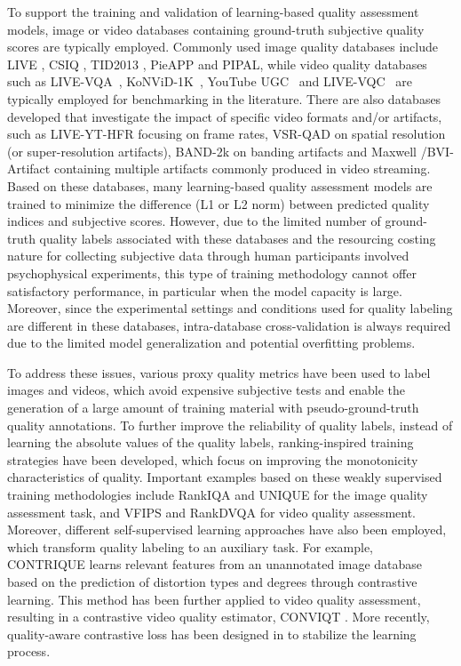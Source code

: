\documentclass[11pt,a4paper]{article}
\begin{document}
To support the training and validation of learning-based quality assessment models, image or video databases containing ground-truth subjective quality scores are typically employed. Commonly used image quality databases include LIVE \cite{sheikh2006astatistical}, CSIQ \cite{larson2010most}, TID2013 \cite{ponomarenko2013color}, PieAPP and PIPAL, while video quality databases such as LIVE-VQA~\cite{seshadrinathan2010study}, KoNViD-1K~\cite{hosu2017konstanz}, YouTube UGC~\cite{wang2019youtube} and LIVE-VQC~\cite{sinno2018large} are typically employed for benchmarking in the literature. There are also databases developed that investigate the impact of specific video formats and/or artifacts, such as LIVE-YT-HFR  \cite{madhusudana2021subjective} focusing on frame rates, VSR-QAD \cite{zhou2024database} on spatial resolution (or super-resolution artifacts), BAND-2k \cite{chen2024band2k} on banding artifacts and Maxwell \cite{wu2023towards}/BVI-Artifact \cite{feng2024bvi} containing multiple artifacts commonly produced in video streaming. Based on these databases, many learning-based quality assessment models are trained to minimize the difference (L1 or L2 norm) between predicted quality indices and subjective scores. However, due to the limited number of ground-truth quality labels associated with these databases and the resourcing costing nature for collecting subjective data through human participants involved psychophysical experiments, this type of training methodology cannot offer satisfactory performance, in particular when the model capacity is large. Moreover, since the experimental settings and conditions used for quality labeling are different in these databases, intra-database cross-validation is always required due to the limited model generalization and potential overfitting problems. 

To address these issues, various proxy quality metrics have been used to label images and videos, which avoid expensive subjective tests and enable the generation of a large amount of training material with pseudo-ground-truth quality annotations. To further improve the reliability of quality labels, instead of learning the absolute values of the quality labels, ranking-inspired training strategies have been developed, which focus on improving the monotonicity characteristics of quality. Important examples based on these weakly supervised training methodologies include RankIQA \cite{liu2017rankiqa} and UNIQUE \cite{zhang2021uncertainty} for the image quality assessment task, and VFIPS \cite{hou2022perceptual} and RankDVQA \cite{feng2024rankdvqa} for video quality assessment. Moreover, different self-supervised learning approaches have also been employed, which transform quality labeling to an auxiliary task. For example, CONTRIQUE \cite{madhusudana2022image} learns relevant features from an unannotated image database based on the prediction of distortion types and degrees through contrastive learning. This method has been further applied to video quality assessment, resulting in a contrastive video quality estimator, CONVIQT \cite{madhusudana2023conviqt}. More recently, quality-aware contrastive loss has been designed in \cite{zhao2023quality,peng2024rmt} to stabilize the learning process.
\end{document}
